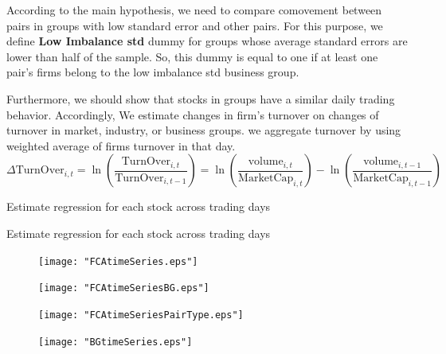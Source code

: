 \documentclass[12pt, a4paper]{article}
\begin{document}
According to the main hypothesis, we need to compare comovement between pairs in groups with low standard error and other pairs.
 For this purpose, we define \textbf{Low Imbalance std} dummy for groups whose average standard errors are lower than half of the sample. 
So, this dummy is equal to one if at least one pair's firms belong to the low imbalance std business group.
\begin{table}[htbp]
	\centering
	\resizebox{\textwidth}{!}{
		
	}
\end{table}
\FloatBarrier

Furthermore, we should show that stocks in groups have a similar daily trading behavior. Accordingly, We estimate changes in firm's turnover on changes of turnover in market, industry, or business groups. we aggregate turnover by using weighted average of firms turnover in that day.
\begin{equation*}
	\Delta \text{TurnOver}_{i,t} = \ln(\frac{\text{TurnOver}_{i,t}}{\text{TurnOver}_{i,t-1}}) = 
	\ln({\frac{\text{volume}_{i,t}}{\text{MarketCap}_{i,t}}}) - \ln({\frac{\text{volume}_{i,t-1}}{\text{MarketCap}_{i,t-1}}})
\end{equation*}


	\begin{table}[htbp]
	\centering
	\caption{Estimate regression for
		each stock across trading days  }
	\resizebox{0.6\textheight}{!}{
		
	}
\end{table}


	\begin{table}[htbp]
	\centering
	\caption{Estimate regression for
		each stock across trading days  }
	\resizebox{0.7\textheight}{!}{
		\centering
		
	}
\end{table}

\newpage
		\begin{figure}
	\centering  
	\texttt{[image: "FCAtimeSeries.eps"]}
	
\end{figure} 

			\begin{figure}
	\centering  
	\texttt{[image: "FCAtimeSeriesBG.eps"]}
\end{figure}    

\begin{figure}
	\centering  
	\texttt{[image: "FCAtimeSeriesPairType.eps"]}
\end{figure}




	\begin{figure}
	\centering  
	\texttt{[image: "BGtimeSeries.eps"]}
	
\end{figure}  
\end{document}
